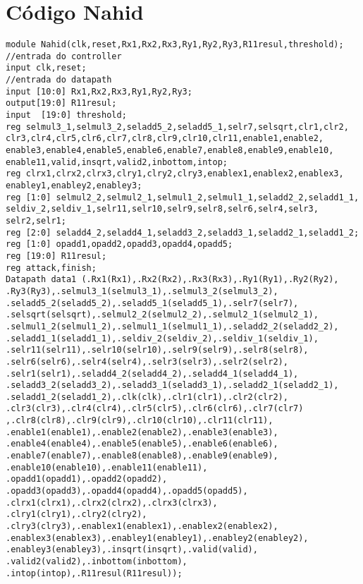 \section{Código Nahid}
\label{nahidcode}
\begin{lstlisting}[style={verilog-style}]
module Nahid(clk,reset,Rx1,Rx2,Rx3,Ry1,Ry2,Ry3,R11resul,threshold);
//entrada do controller
input clk,reset;
//entrada do datapath
input [10:0] Rx1,Rx2,Rx3,Ry1,Ry2,Ry3;
output[19:0] R11resul;
input  [19:0] threshold;
reg selmul3_1,selmul3_2,seladd5_2,seladd5_1,selr7,selsqrt,clr1,clr2,
clr3,clr4,clr5,clr6,clr7,clr8,clr9,clr10,clr11,enable1,enable2,
enable3,enable4,enable5,enable6,enable7,enable8,enable9,enable10,
enable11,valid,insqrt,valid2,inbottom,intop;
reg clrx1,clrx2,clrx3,clry1,clry2,clry3,enablex1,enablex2,enablex3,
enabley1,enabley2,enabley3;
reg [1:0] selmul2_2,selmul2_1,selmul1_2,selmul1_1,seladd2_2,seladd1_1,
seldiv_2,seldiv_1,selr11,selr10,selr9,selr8,selr6,selr4,selr3,
selr2,selr1;
reg [2:0] seladd4_2,seladd4_1,seladd3_2,seladd3_1,seladd2_1,seladd1_2;
reg [1:0] opadd1,opadd2,opadd3,opadd4,opadd5;
reg [19:0] R11resul;
reg attack,finish;
Datapath data1 (.Rx1(Rx1),.Rx2(Rx2),.Rx3(Rx3),.Ry1(Ry1),.Ry2(Ry2),
.Ry3(Ry3),.selmul3_1(selmul3_1),.selmul3_2(selmul3_2),
.seladd5_2(seladd5_2),.seladd5_1(seladd5_1),.selr7(selr7),
.selsqrt(selsqrt),.selmul2_2(selmul2_2),.selmul2_1(selmul2_1),
.selmul1_2(selmul1_2),.selmul1_1(selmul1_1),.seladd2_2(seladd2_2),
.seladd1_1(seladd1_1),.seldiv_2(seldiv_2),.seldiv_1(seldiv_1),
.selr11(selr11),.selr10(selr10),.selr9(selr9),.selr8(selr8),
.selr6(selr6),.selr4(selr4),.selr3(selr3),.selr2(selr2),
.selr1(selr1),.seladd4_2(seladd4_2),.seladd4_1(seladd4_1),
.seladd3_2(seladd3_2),.seladd3_1(seladd3_1),.seladd2_1(seladd2_1),
.seladd1_2(seladd1_2),.clk(clk),.clr1(clr1),.clr2(clr2),
.clr3(clr3),.clr4(clr4),.clr5(clr5),.clr6(clr6),.clr7(clr7)
,.clr8(clr8),.clr9(clr9),.clr10(clr10),.clr11(clr11),
.enable1(enable1),.enable2(enable2),.enable3(enable3),
.enable4(enable4),.enable5(enable5),.enable6(enable6),
.enable7(enable7),.enable8(enable8),.enable9(enable9),
.enable10(enable10),.enable11(enable11), .opadd1(opadd1),.opadd2(opadd2),
.opadd3(opadd3),.opadd4(opadd4),.opadd5(opadd5),
.clrx1(clrx1),.clrx2(clrx2),.clrx3(clrx3),
.clry1(clry1),.clry2(clry2),
.clry3(clry3),.enablex1(enablex1),.enablex2(enablex2),
.enablex3(enablex3),.enabley1(enabley1),.enabley2(enabley2),
.enabley3(enabley3),.insqrt(insqrt),.valid(valid),
.valid2(valid2),.inbottom(inbottom),
.intop(intop),.R11resul(R11resul));


\end{lstlisting}

